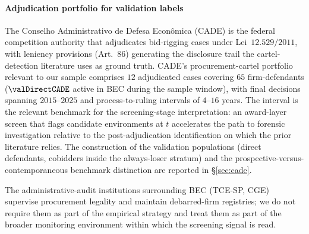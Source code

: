 \paragraph{Adjudication portfolio for validation labels}
The Conselho Administrativo de Defesa Econ\^omica (CADE) is the
federal competition authority that adjudicates bid-rigging cases
under Lei~$12.529/2011$, with leniency provisions (Art.~$86$)
generating the disclosure trail the cartel-detection literature
uses as ground truth. CADE's procurement-cartel portfolio
relevant to our sample comprises $12$ adjudicated cases covering
$65$ firm-defendants ($\valDirectCADE$ active in BEC during the
sample window), with final decisions spanning $2015$--$2025$ and
process-to-ruling intervals of $4$--$16$ years. The interval is
the relevant benchmark for the screening-stage interpretation:
an award-layer screen that flags candidate environments at $t$
accelerates the path to forensic investigation relative to the
post-adjudication identification on which the prior literature
relies. The construction of the validation populations
(direct defendants, cobidders inside the always-loser stratum)
and the prospective-versus-contemporaneous benchmark distinction
are reported in §\ref{sec:cade}.

The administrative-audit institutions surrounding BEC (TCE-SP,
CGE) supervise procurement legality and maintain debarred-firm
registries; we do not require them as part of the empirical
strategy and treat them as part of the broader monitoring
environment within which the screening signal is read.

